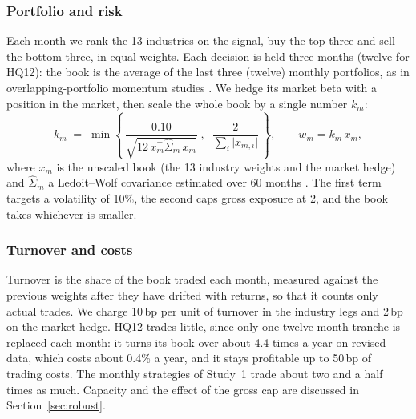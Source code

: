 \documentclass[11pt,letterpaper]{article}
\begin{document}
\subsubsection{Portfolio and risk}
Each month we rank the 13 industries on the signal, buy the top three and sell
the bottom three, in equal weights. Each decision is held three months (twelve
for HQ12): the book is the average of the last three (twelve) monthly
portfolios, as in overlapping-portfolio momentum studies \citep{jegadeesh1993}. We hedge its market beta with a position in the market, then scale
the whole book by a single number $k_m$:
\begin{equation}\label{eq:sizing}
k_m \;=\; \min\left\{\, \frac{0.10}{\sqrt{12\,x_m^{\top}\hat\Sigma_m\,x_m}}\;,\;\;
\frac{2}{\sum_{i}\lvert x_{m,i}\rvert} \,\right\},
\qquad w_m = k_m\,x_m ,
\end{equation}
where $x_m$ is the unscaled book (the 13 industry weights and the market hedge)
and $\hat\Sigma_m$ a Ledoit--Wolf covariance estimated over 60 months
\citep{ledoit2004}. The first term targets a volatility of 10\%, the second caps
gross exposure at 2, and the book takes whichever is smaller.

\subsubsection{Turnover and costs}
Turnover is the share of the book traded each month, measured against the
previous weights after they have drifted with returns, so that it counts only
actual trades. We charge 10\,bp per unit of turnover in the industry legs and
2\,bp on the market hedge. HQ12 trades little, since only one twelve-month tranche is replaced
each month: it turns its book over about 4.4 times a year on revised data,
which costs about 0.4\% a year, and it stays profitable up to 50\,bp of trading costs. The
monthly strategies of Study~1 trade about two and a half times as much.
Capacity and the effect of the gross cap are discussed in
Section~\ref{sec:robust}.
\end{document}
